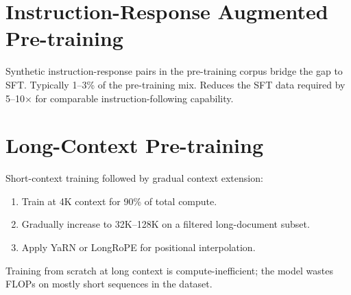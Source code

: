 \section{Instruction-Response Augmented Pre-training}
Synthetic instruction-response pairs in the pre-training corpus bridge the gap to SFT. Typically 1--3\% of the pre-training mix. Reduces the SFT data required by 5--10$\times$ for comparable instruction-following capability.

\section{Long-Context Pre-training}

Short-context training followed by gradual context extension:
\begin{enumerate}
  \item Train at 4K context for 90\% of total compute.
  \item Gradually increase to 32K--128K on a filtered long-document subset.
  \item Apply YaRN or LongRoPE for positional interpolation.
\end{enumerate}
Training from scratch at long context is compute-inefficient; the model wastes FLOPs on mostly short sequences in the dataset.
